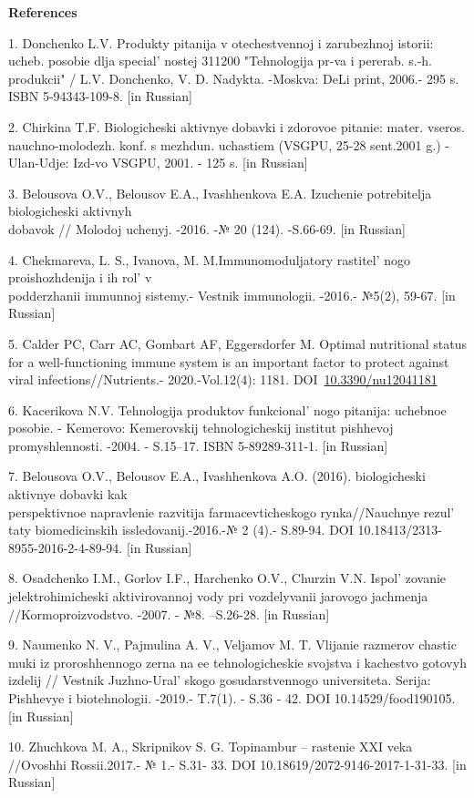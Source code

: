 \begin{center}
{\bfseries References}
\end{center}

\begin{references}
1. Donchenko L.V. Produkty pitanija v otechestvennoj i zarubezhnoj
istorii: ucheb. posobie dlja special' nostej 311200
"Tehnologija pr-va i pererab. s.-h. produkcii" / L.V. Donchenko, V. D.
Nadykta. -Moskva: DeLi print, 2006.- 295 s. ISBN 5-94343-109-8. {[}in
Russian{]}

2. Chirkina T.F. Biologicheski aktivnye dobavki i zdorovoe pitanie:
mater. vseros. nauchno-molodezh. konf. s mezhdun. uchastiem (VSGPU,
25-28 sent.2001 g.) - Ulan-Udje: Izd-vo VSGPU, 2001. - 125 s. {[}in
Russian{]}

3. Belousova O.V., Belousov E.A., Ivashhenkova E.A. Izuchenie
potrebitelja biologicheski aktivnyh \\dobavok // Molodoj uchenyj. -2016.
-№ 20 (124). -S.66-69. {[}in Russian{]}

4. Chekmareva, L. S., Ivanova, M. M.Immunomoduljatory
rastitel' nogo proishozhdenija i ih rol'{}
v \\podderzhanii immunnoj sistemy.- Vestnik immunologii. -2016.- №5(2),
59-67. {[}in Russian{]}

5. Calder PC, Carr AC, Gombart AF, Eggersdorfer M. Optimal nutritional
status for a well-functioning immune system is an important factor to
protect against viral infections//Nutrients.- 2020.-Vol.12(4): 1181.
DOI~\href{https://doi.org/10.3390/nu12041181}{10.3390/nu12041181}

6. Kacerikova N.V. Tehnologija produktov funkcional' nogo
pitanija: uchebnoe posobie. - Kemerovo: Kemerovskij tehnologicheskij
institut pishhevoj promyshlennosti. -2004. - S.15--17. ISBN
5-89289-311-1. {[}in Russian{]}

7. Belousova O.V., Belousov E.A., Ivashhenkova A.O. (2016). biologicheski
aktivnye dobavki kak \\perspektivnoe napravlenie razvitija
farmacevticheskogo rynka//Nauchnye rezul' taty
biomedicinskih issledovanij.-2016.-№ 2 (4).- S.89-94. DOI
10.18413/2313-8955-2016-2-4-89-94. {[}in Russian{]}

8. Osadchenko I.M., Gorlov I.F., Harchenko O.V., Churzin V.N.
Ispol' zovanie jelektrohimicheski aktivirovannoj vody pri
vozdelyvanii jarovogo jachmenja //Kormoproizvodstvo. -2007. - №8.
--S.26-28. {[}in Russian{]}

9. Naumenko N. V., Pajmulina A. V., Veljamov M. T. Vlijanie razmerov
chastic muki iz proroshhennogo zerna na ee tehnologicheskie svojstva i
kachestvo gotovyh izdelij // Vestnik Juzhno-Ural' skogo
gosudarstvennogo universiteta. Serija: Pishhevye i biotehnologii.
-2019.- T.7(1). - S.36 - 42. DOI 10.14529/food190105. {[}in Russian{]}

10. Zhuchkova M. A., Skripnikov S. G. Topinambur -- rastenie XXI veka
//Ovoshhi Rossii.2017.- № 1.- S.31- 33. DOI
10.18619/2072-9146-2017-1-31-33. {[}in Russian{]}
\end{references}

